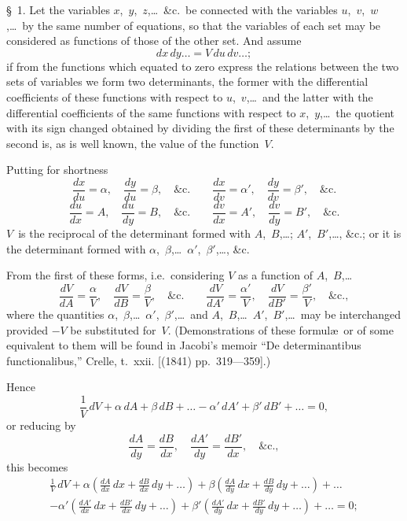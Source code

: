 \documentclass[11pt,a4paper]{article}
\newcommand{\papersection}[1]{\S\ #1.}
\begin{document}
\vspace{10pt}

\papersection{1} Let the variables $x$,~$y$,~$z$,\ldots\ \&c.\ be connected with the variables $u$,~$v$,~$w$,\ldots\ by the same number of equations, so that the variables of each set may be considered as functions of those of the other set. And assume
\[
dx\,dy\ldots = V\,du\,dv\ldots;
\]
if from the functions which equated to zero express the relations between the two sets of variables we form two determinants, the former with the differential coefficients of these functions with respect to $u$,~$v$,\ldots\ and the latter with the differential coefficients of the same functions with respect to $x$,~$y$,\ldots\ the quotient with its sign changed obtained by dividing the first of these determinants by the second is, as is well known, the value of the function~$V$.

Putting for shortness
\[
\frac{dx}{du} = \alpha, \quad \frac{dy}{du} = \beta, \quad \&\text{c.} \qquad
\frac{dx}{dv} = \alpha', \quad \frac{dy}{dv} = \beta', \quad \&\text{c.}
\]
\[
\frac{du}{dx} = A, \quad \frac{du}{dy} = B, \quad \&\text{c.} \qquad
\frac{dv}{dx} = A', \quad \frac{dv}{dy} = B', \quad \&\text{c.}
\]
$V$~is the reciprocal of the determinant formed with $A$,~$B$,\ldots; $A'$,~$B'$,\ldots, \&c.; or it is the determinant formed with $\alpha$,~$\beta$,\ldots\ $\alpha'$,~$\beta'$,\ldots, \&c.

From the first of these forms, i.e.\ considering $V$ as a function of $A$,~$B$,\ldots
\[
\frac{dV}{dA} = \frac{\alpha}{V}, \quad \frac{dV}{dB} = \frac{\beta}{V}, \quad \&\text{c.} \qquad
\frac{dV}{dA'} = \frac{\alpha'}{V}, \quad \frac{dV}{dB'} = \frac{\beta'}{V}, \quad \&\text{c.},
\]
where the quantities $\alpha$,~$\beta$,\ldots\ $\alpha'$,~$\beta'$,\ldots\ and $A$,~$B$,\ldots\ $A'$,~$B'$,\ldots\ may be interchanged provided $-V$ be substituted for~$V$. (Demonstrations of these formul\ae\ or of some equivalent to them will be found in Jacobi's memoir ``De determinantibus functionalibus,'' Crelle, t.~xxii. [(1841) pp.~319---359].)

Hence
\[
\frac{1}{V}\,dV + \alpha\,dA + \beta\,dB + \ldots - \alpha'\,dA' + \beta'\,dB' + \ldots = 0,
\]
or reducing by
\[
\frac{dA}{dy} = \frac{dB}{dx}, \quad \frac{dA'}{dy} = \frac{dB'}{dx}, \quad \&\text{c.},
\]
this becomes
\begin{multline*}
\frac{1}{V}\,dV + \alpha\left(\frac{dA}{dx}\,dx + \frac{dB}{dx}\,dy + \ldots\right) + \beta\left(\frac{dA}{dy}\,dx + \frac{dB}{dy}\,dy + \ldots\right) + \ldots \\
- \alpha'\left(\frac{dA'}{dx}\,dx + \frac{dB'}{dx}\,dy + \ldots\right) + \beta'\left(\frac{dA'}{dy}\,dx + \frac{dB'}{dy}\,dy + \ldots\right) + \ldots = 0;
\end{multline*}
\end{document}
